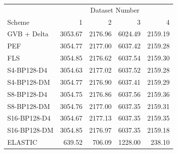 \begin{tabular}{lrrrr}
\toprule
 & \multicolumn{4}{c}{Dataset Number} \\
Scheme & 1 & 2 & 3 & 4 \\
\midrule
GVB + Delta & 3053.67 & 2176.96 & 6024.49 & 2159.19 \\
PEF & 3054.77 & 2177.00 & 6037.42 & 2159.28 \\
FLS & 3054.85 & 2176.62 & 6037.54 & 2159.30 \\
S4-BP128-D4 & 3054.63 & 2177.02 & 6037.52 & 2159.28 \\
S4-BP128-DM & 3054.77 & 2176.90 & 6037.41 & 2159.29 \\
S8-BP128-D4 & 3054.75 & 2176.86 & 6037.56 & 2159.36 \\
S8-BP128-DM & 3054.76 & 2177.00 & 6037.35 & 2159.31 \\
S16-BP128-D4 & 3054.67 & 2177.13 & 6037.35 & 2159.35 \\
S16-BP128-DM & 3054.85 & 2176.97 & 6037.35 & 2159.18 \\
ELASTIC & 639.52 & 706.09 & 1228.00 & 238.10 \\
\bottomrule
\end{tabular}
